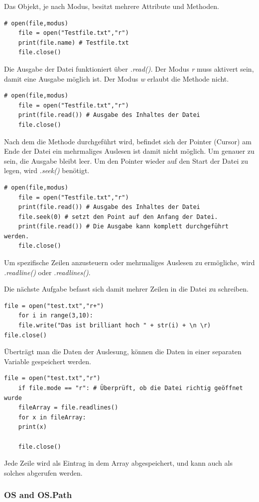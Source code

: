 Das Objekt, je nach Modus, besitzt mehrere Attribute und Methoden.
\begin{lstlisting}[style=python]
	# open(file,modus)
	file = open("Testfile.txt","r")
	print(file.name) # Testfile.txt
	file.close() 
\end{lstlisting}

Die Ausgabe der Datei funktioniert über \textit{.read().} Der Modus \textit{r} muss aktivert sein, damit eine Ausgabe möglich ist. Der Modus \textit{w} erlaubt die Methode nicht.
\begin{lstlisting}[style=python]
	# open(file,modus)
	file = open("Testfile.txt","r")
	print(file.read()) # Ausgabe des Inhaltes der Datei
	file.close() 
\end{lstlisting}
Nach dem die Methode durchgeführt wird, befindet sich der Pointer (Cursor) am Ende der Datei ein mehrmaliges Auslesen ist damit nicht möglich. Um genauer zu sein, die Ausgabe bleibt leer. Um den Pointer wieder auf den Start der Datei zu legen, wird \textit{.seek()} benötigt.
\begin{lstlisting}[style=python]
	# open(file,modus)
	file = open("Testfile.txt","r")
	print(file.read()) # Ausgabe des Inhaltes der Datei
	file.seek(0) # setzt den Point auf den Anfang der Datei.
	print(file.read()) # Die Ausgabe kann komplett durchgeführt werden.
	file.close() 
\end{lstlisting}
Um spezifische Zeilen anzusteuern oder mehrmaliges Auslesen zu ermögliche, wird \textit{.readline()} oder \textit{.readlines()}. 

Die nächste Aufgabe befasst sich damit mehrer Zeilen in die Datei zu schreiben.
\begin{lstlisting}[style=python]
	file = open("test.txt","r+")
	for i in range(3,10):
	file.write("Das ist brilliant hoch " + str(i) + \n \r) 	file.close()	
\end{lstlisting}

Überträgt man die Daten der Auslesung, können die Daten in einer separaten Variable gespeichert werden.
\begin{lstlisting}[style=python]
	file = open("test.txt","r")
	if file.mode == "r": # Überprüft, ob die Datei richtig geöffnet wurde
	fileArray = file.readlines()
	for x in fileArray:
	print(x)
	
	file.close()	
\end{lstlisting}
Jede Zeile wird als Eintrag in dem Array abgespeichert, und kann auch als solches abgerufen werden.

\subsubsection{OS and OS.Path}

